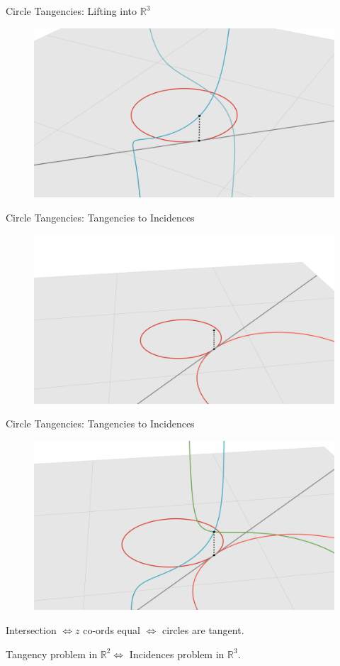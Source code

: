 \documentclass{beamer}
\newcommand{\RR}{\mathbb R}
\newcommand{\nfr}[1]{\begin{frame} #1
\end{frame}}
\begin{document}
\nfr{{Circle Tangencies: Lifting into $\RR^3$}

\begin{figure}[h]
    \centering
    \includegraphics[width=0.8
    \textwidth, trim={5cm 0 4cm 2cm}, clip=true]{images/Diagram3d.png}
\end{figure}

}




\nfr{{Circle Tangencies: Tangencies to Incidences}

\begin{figure}[h]
    \centering
    \includegraphics[width=0.8
    \textwidth, trim={5cm 0 4cm 2cm}, clip=true]{images/Diagram4a.png}
\end{figure}


}

\nfr{{Circle Tangencies: Tangencies to Incidences}

\begin{figure}[h]
    \centering
    \includegraphics[width=0.8
    \textwidth, trim={5cm 0 4cm 2cm}, clip=true]{images/Diagram4b.png}
\end{figure}
Intersection  $\iff z$ co-ords equal $\iff$  circles are tangent.

Tangency problem in $\RR^2 \iff $ Incidences problem in $\RR^3$.
}
\end{document}
